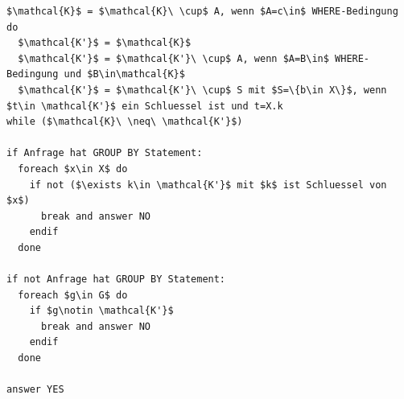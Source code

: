 \begin{lstlisting}[mathescape]
$\mathcal{K}$ = $\mathcal{K}\ \cup$ A, wenn $A=c\in$ WHERE-Bedingung
do 
  $\mathcal{K'}$ = $\mathcal{K}$
  $\mathcal{K'}$ = $\mathcal{K'}\ \cup$ A, wenn $A=B\in$ WHERE-Bedingung und $B\in\mathcal{K}$
  $\mathcal{K'}$ = $\mathcal{K'}\ \cup$ S mit $S=\{b\in X\}$, wenn $t\in \mathcal{K'}$ ein Schluessel ist und t=X.k
while ($\mathcal{K}\ \neq\ \mathcal{K'}$)

if Anfrage hat GROUP BY Statement:
  foreach $x\in X$ do
    if not ($\exists k\in \mathcal{K'}$ mit $k$ ist Schluessel von $x$)
      break and answer NO
    endif
  done

if not Anfrage hat GROUP BY Statement:
  foreach $g\in G$ do
    if $g\notin \mathcal{K'}$
      break and answer NO
    endif
  done

answer YES
\end{lstlisting}

